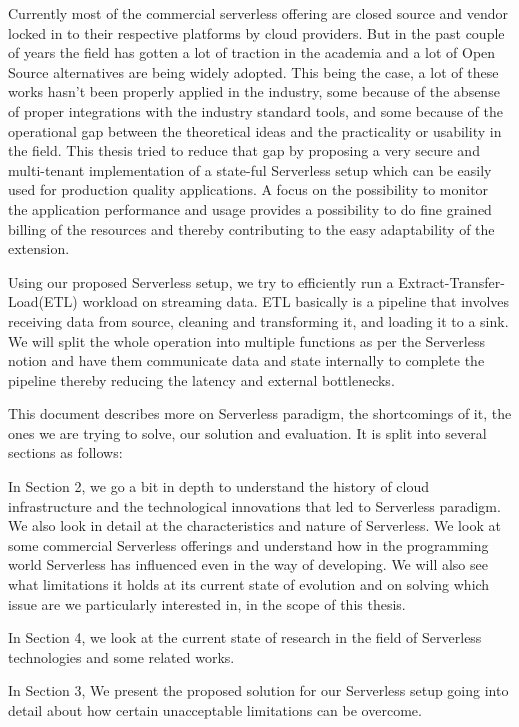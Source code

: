 \documentclass[12pt]{article}
\begin{document}
Currently most of the commercial serverless offering are closed source
and vendor locked in to their respective platforms by cloud providers. But in the
past couple of years the field has gotten a lot of traction in the academia and
a lot of Open Source alternatives are being widely adopted. This being the case, a lot
of these works hasn't been properly applied in the industry, some because of
the absense of proper integrations with the industry standard tools, and some
because of the operational gap between the theoretical ideas and the
practicality or usability in the field. This thesis tried to reduce that
gap by proposing a very secure and multi-tenant implementation of a
state-ful Serverless setup which can be easily used for production quality
applications. A focus on the possibility to monitor the application performance
and usage provides a possibility to do fine grained billing of the resources and thereby
contributing to the easy adaptability of the extension.

Using our proposed Serverless setup, we try to efficiently run a
Extract-Transfer-Load(ETL) workload on streaming data. ETL basically is a pipeline that involves receiving data
from source, cleaning and transforming it, and loading it to a sink. We will
split the whole operation into multiple functions as per the Serverless notion
and have them communicate data and state internally to complete the pipeline
thereby reducing the latency and external bottlenecks.

This document describes more on Serverless paradigm, the shortcomings of it, the
ones we are trying to solve, our solution and evaluation. It is split into
several sections as follows:

In Section 2, we go a bit in depth to understand the history of cloud
infrastructure and the technological innovations that led to Serverless
paradigm. We also look in detail at the characteristics and nature of
Serverless. We look at some commercial Serverless offerings and understand how
in the programming world Serverless has influenced even in the way of developing.
We will also see what limitations it holds at its current state of evolution and
on solving which issue are we particularly interested in, in the scope of this
thesis.

In Section 4, we look at the current state of research in the field of
Serverless technologies and some related works.

In Section 3, We present the proposed solution for our Serverless setup going
into detail about how certain unacceptable limitations can be overcome.
\end{document}
